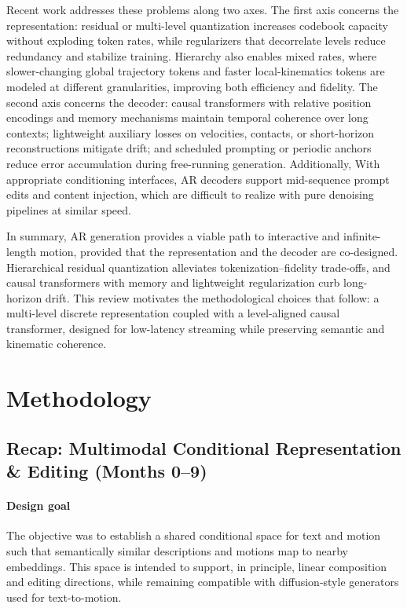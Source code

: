 \documentclass[a4paper,12pt]{article}
\begin{document}
Recent work addresses these problems along two axes. The first axis concerns the representation: residual or multi-level quantization increases codebook capacity without exploding token rates, while regularizers that decorrelate levels reduce redundancy and stabilize training. Hierarchy also enables mixed rates, where slower-changing global trajectory tokens and faster local-kinematics tokens are modeled at different granularities, improving both efficiency and fidelity. The second axis concerns the decoder: causal transformers with relative position encodings and memory mechanisms maintain temporal coherence over long contexts; lightweight auxiliary losses on velocities, contacts, or short-horizon reconstructions mitigate drift; and scheduled prompting or periodic anchors reduce error accumulation during free-running generation. Additionally, With appropriate conditioning interfaces, AR decoders support mid-sequence prompt edits and content injection, which are difficult to realize with pure denoising pipelines at similar speed.

In summary, AR generation provides a viable path to interactive and infinite-length motion, provided that the representation and the decoder are co-designed. Hierarchical residual quantization alleviates tokenization–fidelity trade-offs, and causal transformers with memory and lightweight regularization curb long-horizon drift. This review motivates the methodological choices that follow: a multi-level discrete representation coupled with a level-aligned causal transformer, designed for low-latency streaming while preserving semantic and kinematic coherence.


\section{Methodology}
\subsection{Recap: Multimodal Conditional Representation \& Editing (Months 0–9)}

\paragraph{Design goal}
The objective was to establish a shared conditional space for text and motion such that semantically similar descriptions and motions map to nearby embeddings. This space is intended to support, in principle, linear composition and editing directions, while remaining compatible with diffusion-style generators used for text-to-motion.
\end{document}

